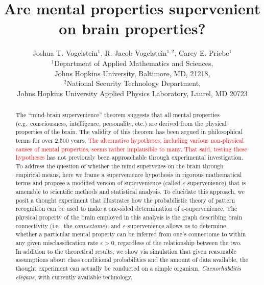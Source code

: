 \documentclass{article}
\title{Are mental properties supervenient on brain properties?}
\author{Joshua T. Vogelstein$^1$, R. Jacob Vogelstein$^{1,2}$, Carey E. Priebe$^1$\\
$^1$Department of Applied Mathematics and Sciences, \\ Johns Hopkins University, Baltimore, MD, 21218,\\ $^2$National Security Technology Department, \\ Johns Hopkins University Applied Physics Laboratory, Laurel, MD 20723}
\providecommand{\tr}[1]{\textcolor{red}{#1}}
\begin{document}
\maketitle
\begin{abstract}


The ``mind-brain supervenience'' theorem suggests that all mental properties (e.g.\ consciousness, intelligence, personality, etc.) are derived from the physical properties of the brain. The validity of this theorem has been argued in philosophical terms for over 2,500 years. \tr{The alternative hypotheses, including various non-physical causes of mental properties, seems rather implausible to many.  That said, testing these hypotheses } has not previously been approachable through experimental investigation. To address the question of whether the mind supervenes on the brain through empirical means, here we frame a supervenience hypothesis in rigorous mathematical terms and propose a modified version of supervenience (called $\varepsilon$-supervenience) that is amenable to scientific methods and statistical analysis. To elucidate this approach, we posit a thought experiment that illustrates how the probabilistic theory of pattern recognition can be used to make a one-sided determination of $\varepsilon$-supervenience. The physical property of the brain employed in this analysis is the graph describing brain connectivity (i.e., the \emph{connectome}), and $\varepsilon$-supervenience allows us to determine whether a particular mental property can be inferred from one's connectome to within any given misclassification rate $\varepsilon > 0$, regardless of the relationship between the two. In addition to the theoretical results, we show via simulation that given reasonable assumptions about class conditional probabilities and the amount of data available, the thought experiment can actually be conducted on a simple organism, \emph{Caenorhabditis elegans}, with currently available technology.

\end{abstract}

\vspace*{0.5 in}
\end{document}
